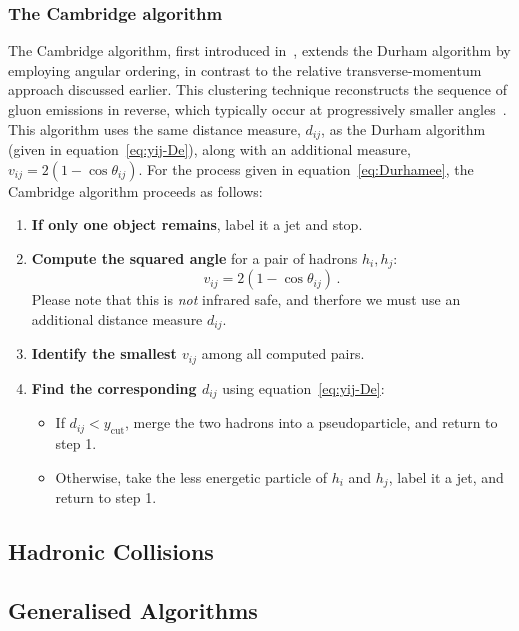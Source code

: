 \subsubsection{The Cambridge algorithm}
The Cambridge algorithm, first introduced in~\cite{Dokshitzer:1997in}, extends the Durham algorithm by employing angular ordering, in contrast to the relative transverse-momentum approach discussed earlier. This clustering technique reconstructs the sequence of gluon emissions in reverse, which typically occur at progressively smaller angles~\cite{Banfi:2016yyq}.
This algorithm uses the same distance measure, $d_{ij}$, as the Durham algorithm (given in equation~\ref{eq:yij-De}), along with an additional measure, $v_{ij}=2(1-\cos\theta_{ij})$.
For the process given in equation~\ref{eq:Durhamee}, the Cambridge algorithm proceeds as follows:
\begin{enumerate}
    \item {\textbf{If only one object remains}}, label it a jet and stop.
    \item {\textbf{Compute the squared angle}} for a pair of hadrons $h_i, h_j$:
        \begin{equation}
        \label{eq:vij-cambridge}
        v_{ij}=2(1-\cos\theta_{ij})\,.
    \end{equation}
    Please note that this is \emph{not} infrared safe, and therfore we must use an additional distance measure $d_{ij}$.
    \item {\textbf{Identify the smallest $v_{ij}$}} among all computed pairs. 
    \item{\textbf{Find the corresponding $d_{ij}$}} using  equation~\ref{eq:yij-De}:
    	\begin{itemize}
		\item If $d_{ij}<y_{\mathrm{cut}}$, merge the two hadrons into a pseudoparticle, and return to step 1.
		\item Otherwise, take the less energetic particle of $h_i$ and $h_j$, label it a jet, and return to step 1.
	\end{itemize}
    \end{enumerate}
    
    \subsection{Hadronic Collisions}
    
    \subsection{Generalised Algorithms}

